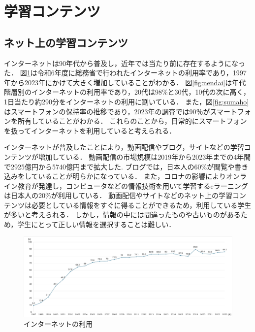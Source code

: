 \documentclass[12pt,a4j,titlepage]{ltjsarticle}
\begin{document}

\clearpage

\section{学習コンテンツ}

\subsection{ネット上の学習コンテンツ}
インターネットは90年代から普及し，近年では当たり前に存在するようになった．
図\ref{fig:net}は令和6年度に総務省で行われたインターネットの利用率であり，1997年から2023年にかけて大きく増加していることがわかる．
図\ref{fig:nendai}は年代階層別のインターネットの利用率であり，20代は98\%と30代，10代の次に高く，1日当たり約290分をインターネットの利用に割いている．
また，図\ref{fig:sumaho}はスマートフォンの保持率の推移であり，2023年の調査では90％がスマートフォンを所有していることがわかる\cite{somu2024}．
これらのことから，日常的にスマートフォンを扱ってインターネットを利用していると考えられる．

インターネットが普及したことにより，動画配信やブログ，サイトなどの学習コンテンツが増加している．
動画配信の市場規模は2019年から2023年までの4年間で2925億円から5740億円まで拡大した\cite{somu2023}.
ブログでは，日本人の60\%が閲覧や書き込みをしていることが明らかになっている．
また，コロナの影響によりオンライン教育が発達し，コンピュータなどの情報技術を用いて学習するeラーニングは日本人の20\%が利用している\cite{somu2023}．
動画配信やサイトなどのネット上の学習コンテンツは必要としている情報をすぐに得ることができるため，利用している学生が多いと考えられる．
しかし，情報の中には間違ったものや古いものがあるため，学生にとって正しい情報を選択することは難しい．

\begin{figure}[!htb]
  \centering
  \includegraphics[width=15cm]{ネット利用率.pdf}
  \caption{インターネットの利用}
  \label{fig:net}
\end{figure}
\end{document}
